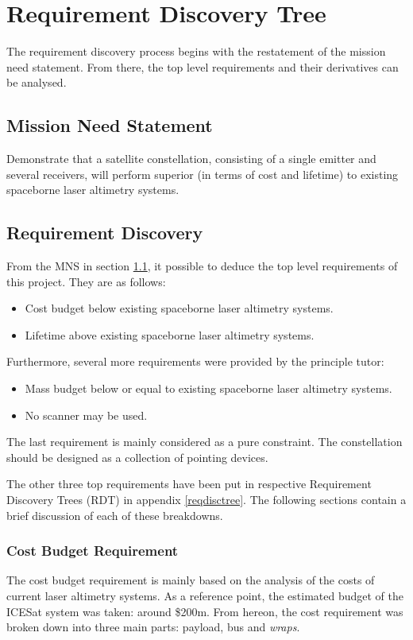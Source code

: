 \section{Requirement Discovery Tree}
\label{blRDT}
The requirement discovery process begins with the restatement of the mission need statement. From there, the top level requirements and their derivatives can be analysed.
\subsection{Mission Need Statement}
\label{dsePPMNS}
Demonstrate that a satellite constellation, consisting of a single emitter and several receivers, will perform superior (in terms of cost and lifetime) to existing spaceborne laser altimetry systems.
\subsection{Requirement Discovery}
\label{blReqDesq}
From the \ac{MNS} in section \ref{dsePPMNS}, it possible to deduce the top level requirements of this project. They are as follows:
\begin{itemize}
	\item Cost budget below existing spaceborne laser altimetry systems.
	\item Lifetime above existing spaceborne laser altimetry systems.
\end{itemize}
Furthermore, several more requirements were provided by the principle tutor:
\begin{itemize}
	\item Mass budget below or equal to existing spaceborne laser altimetry systems.
	\item No scanner may be used.
\end{itemize}
The last requirement is mainly considered as a pure constraint. The constellation should be designed as a collection of pointing devices.

The other three top requirements have been put in respective Requirement Discovery Trees (RDT) in appendix \ref{reqdisctree}. The following sections contain a brief discussion of each of these breakdowns.
\subsubsection{Cost Budget Requirement}
\label{blCBR}
The cost budget requirement is mainly based on the analysis of the costs of current laser altimetry systems. As a reference point, the estimated budget of the ICESat system was taken: around \$200m\cite{icesatc98a}. From hereon, the cost requirement was broken down into three main parts: payload, bus and \emph{wraps}. 

